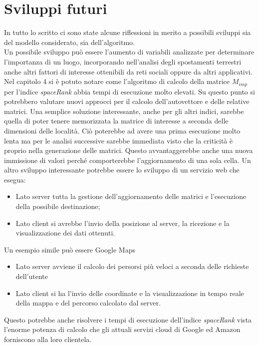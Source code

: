 \section{Sviluppi futuri}
In tutto lo scritto ci sono state alcune riflessioni in merito a possibili sviluppi
sia del modello considerato, sia dell'algoritmo.\\
Un possibile sviluppo pu\`o essere l'aumento di variabili analizzate per determinare
l'importanza di un luogo, incorporando nell'analisi degli spostamenti terrestri anche
altri fattori di interesse ottenibili da reti sociali oppure da altri applicativi.\\
Nel capitolo 4 si \`e potuto notare come l'algoritmo di calcolo della matrice $M_{imp}$
per l'indice \textit{spaceRank} abbia tempi di esecuzione molto elevati. Su questo punto
si potrebbero valutare nuovi approcci per il calcolo dell'autovettore e delle relative
matrici. Una semplice soluzione interessante, anche per gli altri indici, sarebbe quella
di poter tenere memorizzata la matrice di interesse a seconda delle dimensioni delle localit\`a.
Ci\`o poterebbe ad avere una prima esecuzione molto lenta ma per le analisi successive sarebbe
immediata visto che la criticit\`a \`e proprio nella generazione delle matrici.
Questo avvantaggerebbe anche una nuova immissione di valori perch\'e comporterebbe l'aggiornamento
di una sola cella.
Un altro sviluppo interessante potrebbe essere lo sviluppo di un servizio web che esegua:
\begin{itemize}
\item Lato server tutta la gestione dell'aggiornamento delle matrici e l'esecuzione della possibile destinazione;
\item Lato client si avrebbe l'invio della posizione al server, la ricezione e la visualizzazione dei dati ottenuti.
\end{itemize}
Un esempio simile pu\`o essere Google Maps
\begin{itemize}
\item Lato server avviene il calcolo dei persorsi pi\`u veloci a seconda delle richieste dell'utente
\item Lato client si ha l'invio delle coordinate e la visualizzazione in tempo reale della mappa e del percorso calcolato dal server.
\end{itemize}
Questo potrebbe anche risolvere i tempi di esecuzione dell'indice \textit{spaceRank} vista
l'enorme potenza di calcolo che gli attuali servizi cloud di Google ed Amazon forniscono alla loro clientela.
